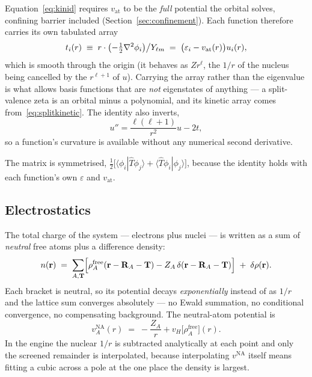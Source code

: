\documentclass[11pt,a4paper]{article}
\begin{document}
Equation~\eqref{eq:kinid} requires $v_{\text{at}}$ to be the \emph{full}
potential the orbital solves, confining barrier included
(Section~\ref{sec:confinement}). Each function therefore carries its own
tabulated array
\begin{equation}
  t_i(r) \;\equiv\; r \cdot \bigl(-\tfrac12\laplacian\phi_i\bigr)\big/ Y_{\ell m}
         \;=\; \bigl(\varepsilon_i - v_{\text{at}}(r)\bigr) u_i(r),
\end{equation}
which is smooth through the origin (it behaves as $Z r^\ell$, the $1/r$ of the
nucleus being cancelled by the $r^{\ell+1}$ of $u$). Carrying the array rather
than the eigenvalue is what allows basis functions that are \emph{not}
eigenstates of anything --- a split-valence zeta is an orbital minus a
polynomial, and its kinetic array comes from~\eqref{eq:splitkinetic}. The
identity also inverts,
\begin{equation}
  u'' = \frac{\ell(\ell+1)}{r^2}u - 2 t ,
\end{equation}
so a function's curvature is available without any numerical second
derivative.

The matrix is symmetrised,
$\tfrac12\bigl[\langle\phi_i|\hat{T}\phi_j\rangle +
\langle\hat{T}\phi_i|\phi_j\rangle\bigr]$, because the identity holds with
each function's own $\varepsilon$ and $v_{\text{at}}$.

\subsection{Electrostatics}
\label{sec:electrostatics}

The total charge of the system --- electrons plus nuclei --- is written as a
sum of \emph{neutral} free atoms plus a difference density:
\begin{equation}
  n(\vb{r}) \;=\; \sum_{A,\vb{T}}
     \Bigl[\rho_A^{\text{free}}(\vb{r}-\vb{R}_A-\vb{T})
           - Z_A\,\delta(\vb{r}-\vb{R}_A-\vb{T})\Bigr]
     \;+\; \delta\rho(\vb{r}) .
  \label{eq:na}
\end{equation}
Each bracket is neutral, so its potential decays \emph{exponentially} instead
of as $1/r$ and the lattice sum converges absolutely --- no Ewald summation,
no conditional convergence, no compensating background. The neutral-atom
potential is
\begin{equation}
  v_A^{\text{NA}}(r) \;=\; -\frac{Z_A}{r} + v_H\bigl[\rho_A^{\text{free}}\bigr](r).
\end{equation}
In the engine the nuclear $1/r$ is subtracted analytically at each point and
only the screened remainder is interpolated, because interpolating
$v^{\text{NA}}$ itself means fitting a cubic across a pole at the one place
the density is largest.
\end{document}
